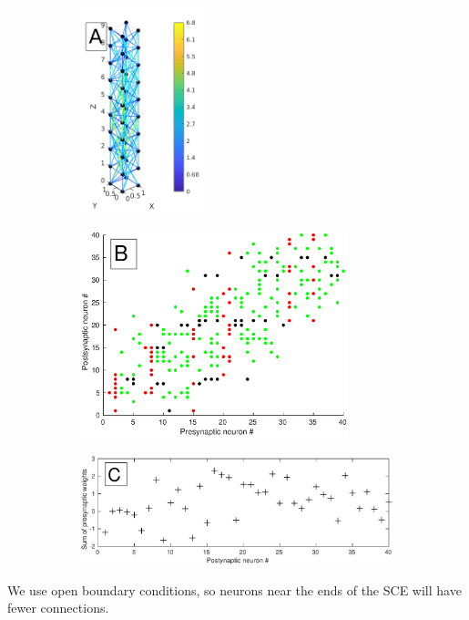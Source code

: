 \documentclass[12pt]{article}
\begin{document}
\begin{figure}[!htb]
 \caption{Example SCE with dimensions 2x2x\color{red}10 (X/Y/Z)\color{black}, $\lambda$=2.5, and C=1. \color{red}A)\color{black}: SCE showing connections between neurons as lines colored using a color scale that indicates the connection length. 
 \color{red}B)\color{black}: Connection matrix. E-E connections are green, E-I are black and \color{red}both I-E and I-I\color{black} are red. 
 \color{red}C) The sum of presynaptic weights for each neuron shows the anisotropy of this model, with substantial variation in input strength and sign between the neuron inputs.\color{black}}
 \label{fig:column_structure}
 \begin{subfigure}{0.3\textwidth}
   \centering
   \includegraphics[height=60mm]{fig/column_structure_A}
 \end{subfigure}%
 \hfill
 \begin{subfigure}{0.7\textwidth}
   \centering
   \includegraphics[height=60mm]{fig/column_structure_B}
 \end{subfigure}%
 \hfill
 
  \begin{subfigure}{\textwidth}
   \centering
   \includegraphics[width=\textwidth]{fig/column_structure_C}
 \end{subfigure}%
\end{figure}
\color{red}We use open boundary conditions, so neurons near the ends of the SCE will have fewer connections. \color{black}
\end{document}
